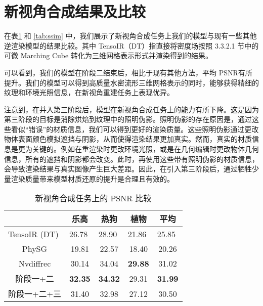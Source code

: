\section {新视角合成结果及比较}

在表\ref{tab:psnr} 和 \ref{tab:ssim} 中，我们展示了新视角合成任务上我们的模型与现有一些其他逆渲染模型的结果比较。其中 TensoIR（DT）指直接将密度场按照 3.3.2.1 节中的可微 Marching Cube 转化为三维网格表示形式并渲染得到的结果。

可以看到，我们的模型在阶段二结束后，相比于现有其他方法，平均 PSNR有所提升。我们的模型可以得到高质量水密流形三维网格表示的同时，能够获得精细的纹理和环境光照信息，在新视角重建任务上表现优异。

注意到，在并入第三阶段后，模型在新视角合成任务上的能力有所下降。这是因为第三阶段的目标是消除烘焙到纹理中的照明伪影。照明伪影的存在原因是，通过这些看似“错误”的材质信息，我们可以得到更好的渲染质量。这些照明伪影通过更改物体表面颜色模拟遮挡与阴影，从而使得渲染结果更加真实。然而，真实的材质信息是更为关键的。例如在重渲染时更改环境光照，或是在几何编辑时更改物体几何信息，所有的遮挡和阴影都会改变。此时，再使用这些带有照明伪影的材质信息，会导致渲染结果与真实图像产生巨大差距。因此，在引入第三阶段后，通过牺牲少量渲染质量带来模型材质还原的提升是合理且有效的。

\begin{table}[h]
  \centering
  \begin{tabular}{ccccc}
    \toprule
                                   & 乐高                        & 热狗                        & 植物                        & 平均                        \\
                                   \midrule
  \multicolumn{1}{l}{TensoIR (DT)} & \multicolumn{1}{l}{26.78} & \multicolumn{1}{l}{28.90} & \multicolumn{1}{l}{21.86} & \multicolumn{1}{l}{25.85} \\
  PhySG                            & 19.81                     & 22.57                     & 18.40                     & 20.26                     \\
  Nvdiffrec                        & 30.14                     & 34.04                     & \textbf{29.88}                     & 31.02                     \\
  \midrule
  阶段一+二                            & \textbf{32.35}                     & \textbf{34.32}                     & 29.31                     & \textbf{31.99}                     \\
  阶段一+二+三                          & 31.40                     & 32.98                     & 27.12                     & 30.50              \\
  \bottomrule
  \end{tabular}
  \caption{新视角合成任务上的 PSNR 比较}
  \label{tab:psnr}
\end{table}

